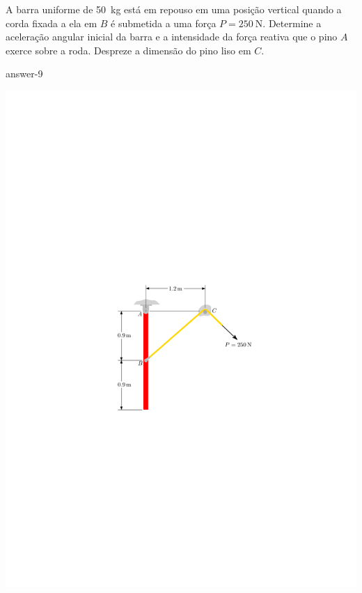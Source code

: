 \item A barra uniforme de \SI{50}{\kilogram} está em repouso em uma posição vertical quando a corda fixada a ela em $B$ é submetida a uma força $P=\SI{250}{\newton}$. Determine a aceleração angular inicial da barra e a intensidade da força reativa que o pino $A$ exerce sobre a roda. Despreze a dimensão do pino liso em $C$.

{answer-9}

\vspace{-1.8cm}
\begin{flushright}
	\includegraphics[scale=1.2]{../../images/draw_8}
\end{flushright}